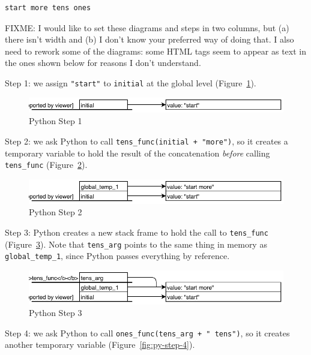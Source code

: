 \begin{lstlisting}
start more tens ones
\end{lstlisting}

{\sc FIXME: I would like to set these diagrams and steps in two columns,
  but (a) there isn't width and (b) I don't know your preferred way of doing that.
  I also need to rework some of the diagrams:
  some HTML tags seem to appear as text in the ones shown below
  for reasons I don't understand.}

Step 1: we assign \texttt{"start"} to \texttt{initial} at the global level
(Figure~\ref{fig:py-step-1}).

\begin{figure}[h]
  \includegraphics{figures/nse/python-step-01.pdf}
  \caption{Python Step 1}
  \label{fig:py-step-1}
\end{figure}

Step 2: we ask Python to call \texttt{tens\_func(initial + "more")},
so it creates a temporary variable to hold the result of the concatenation
\emph{before} calling \texttt{tens\_func}
(Figure~\ref{fig:py-step-2}).

\begin{figure}[h]
  \includegraphics{figures/nse/python-step-02.pdf}
  \caption{Python Step 2}
  \label{fig:py-step-2}
\end{figure}

Step 3: Python creates a new stack frame to hold the call to \texttt{tens\_func}
(Figure~\ref{fig:py-step-3}).
Note that \texttt{tens\_arg} points to the same thing in memory as \texttt{global\_temp\_1},
since Python passes everything by reference.

\begin{figure}[h]
  \includegraphics{figures/nse/python-step-03.pdf}
  \caption{Python Step 3}
  \label{fig:py-step-3}
\end{figure}

Step 4: we ask Python to call \texttt{ones\_func(tens\_arg + " tens")},
so it creates another temporary variable
(Figure~\ref{fig:py-step-4}).

